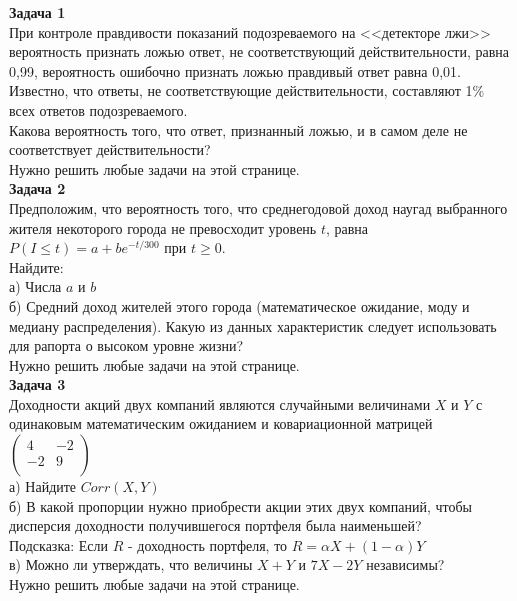 \documentclass[pdftex,12pt,a4paper]{article}
\begin{document}
\textbf{Задача 1} \\ %
При контроле правдивости показаний подозреваемого на <<детекторе лжи>> вероятность признать ложью ответ, не соответствующий действительности, равна 0,99, вероятность ошибочно признать ложью правдивый ответ равна 0,01. Известно, что ответы, не соответствующие действительности, составляют 1\% всех ответов подозреваемого. \\
Какова вероятность того, что ответ, признанный ложью, и в самом деле не соответствует действительности?\\

Нужно решить любые \textbf{} задачи на этой странице. \\


\textbf{Задача 2} \\
Предположим, что вероятность того, что среднегодовой доход наугад выбранного жителя некоторого города не превосходит уровень $t$, равна $P(I\le t)=a+be^{-t/300}$ при $t\ge 0$. \\
Найдите: \\
а) Числа $a$ и $b$ \\
б) Средний доход жителей этого города (математическое ожидание, моду и медиану распределения). Какую из данных характеристик следует использовать для рапорта о высоком уровне жизни? \\

Нужно решить любые \textbf{} задачи на этой странице. \\

\textbf{Задача 3} \\
Доходности акций двух компаний являются случайными величинами $X$ и $Y$ с одинаковым математическим ожиданием и ковариационной матрицей $\left( \begin{array}{cc}
   4 & -2  \\
   -2 & 9  \\
\end{array}\right)$  \\
а) Найдите $Corr(X,Y)$ \\
б) В какой пропорции нужно приобрести акции этих двух компаний, чтобы дисперсия доходности получившегося портфеля была наименьшей? \\
Подсказка: Если $R$ - доходность портфеля, то $R=\alpha X+(1-\alpha)Y$ \\
в) Можно ли утверждать, что величины $X+Y$ и $7X-2Y$ независимы? \\

Нужно решить любые \textbf{} задачи на этой странице. \\
\end{document}
